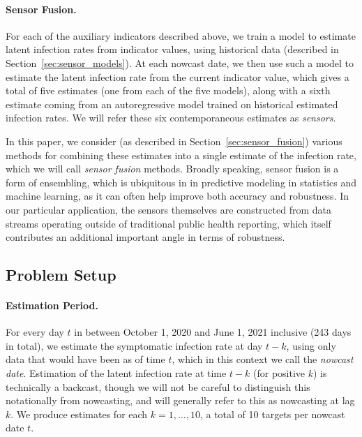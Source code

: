 \documentclass[sts]{imsart}
\theoremstyle{plain}
\theoremstyle{definition}
\theoremstyle{remark}
\begin{document}
\smallskip
\paragraph*{Sensor Fusion.}  

For each of the auxiliary indicators described above, we train a model to
estimate latent infection rates from indicator values, using historical data
(described in Section~\ref{sec:sensor_models}). At each nowcast date, we then  
use such a model to estimate the latent infection rate from the current
indicator value, which gives a total of five estimates (one from each of the
five models), along with a sixth estimate coming from an autoregressive model 
trained on historical estimated infection rates. We will refer these six 
contemporaneous estimates as \emph{sensors}.

In this paper, we consider (as described in Section~\ref{sec:sensor_fusion})
various methods for combining these estimates into a single estimate of the  
infection rate, which we will call \emph{sensor fusion} methods. Broadly
speaking, sensor fusion is a form of ensembling, which is ubiquitous in in
predictive modeling in statistics and machine learning, as it can often help
improve both accuracy and robustness. In our particular application, the sensors
themselves are constructed from data streams operating outside of traditional
public health reporting, which itself contributes an additional important angle
in terms of robustness. %

\subsection{Problem Setup}
\label{sec:problem_setup}

\paragraph*{Estimation Period.}

For every day $t$ in between October 1, 2020 and June 1, 2021 inclusive (243
days in total), we estimate the symptomatic infection rate at day $t-k$, using  
only data that would have been as of time $t$, which in this context we call the  
\emph{nowcast date}. Estimation of the latent infection rate at time $t-k$ (for
positive $k$) is technically a backcast, though we will not be careful to
distinguish this notationally from nowcasting, and will generally refer to this
as nowcasting at lag $k$. We produce estimates for each $k=1,\ldots,10$, a total  
of 10 targets per nowcast date $t$. 
\end{document}
